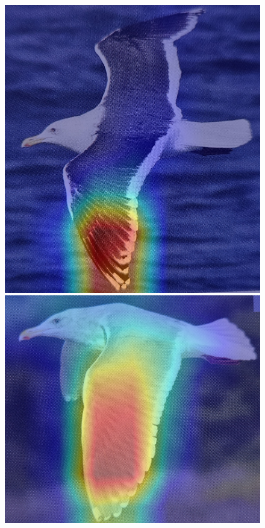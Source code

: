 \documentclass[a4paper,12pt]{report}
\begin{document}
\begin{figure}[htbp]
\begin{multicols}{6}
        \includegraphics[width=\linewidth]{images/interpretability/vgg/bird5.jpg}
        
        \includegraphics[width=\linewidth]{images/interpretability/vgg/bird6.jpg}
        

\end{multicols}
\end{figure}
\end{document}
